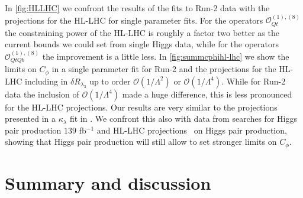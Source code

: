 In \autoref{fig:HLLHC} we confront the results of the fits to Run-2 data with the projections for the HL-LHC for single parameter fits. For the operators $\mathcal{O}_{Qt}^{(1),(8)}$ the constraining power of the HL-LHC is roughly a factor two better as the current bounds we could set from single Higgs data, while for the operators $\mathcal{O}_{QtQb}^{(1),(8)}$ the improvement is a little less.
In \autoref{fig:summcphihl-lhc} we show the limits on $C_{\phi}$ in a single parameter fit for Run-2 and the projections for the HL-LHC
including in $\delta R_{\lambda_3}$ up to order $\mathcal{O}(1/\Lambda^2)$ or $\mathcal{O}(1/\Lambda^4)$. While for Run-2 data the inclusion of $\mathcal{O}(1/\Lambda^4)$ made a huge difference, this is less pronounced for the HL-LHC projections. Our results are very similar to the projections presented in a $\kappa_{\lambda}$ fit in \cite{DiMicco:2019ngk}. 
We confront this also with data from searches for Higgs pair production $139$ fb$^{-1}$ \cite{ATLAS:2021jki}  and HL-LHC projections~\cite{CMS:2018ccd} on Higgs pair production, showing that Higgs pair production will still allow to set stronger limits on $C_{\phi}$. 


\section{Summary and discussion \label{sec:conclusion4tops}}

